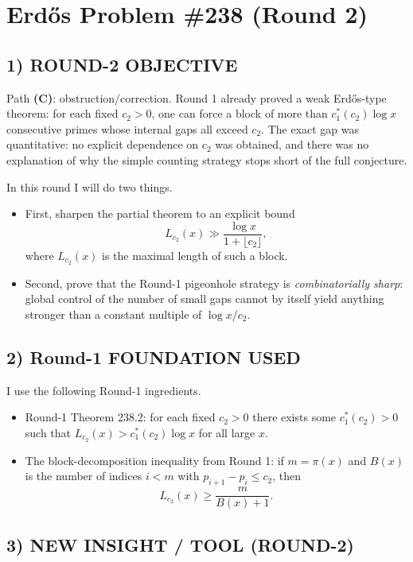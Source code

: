 \section*{Erd\H{o}s Problem \#238 (Round 2)}

\subsection*{1) ROUND-2 OBJECTIVE}

Path \textbf{(C)}: obstruction/correction. Round 1 already proved a weak Erd\H{o}s-type theorem: for each fixed $c_2>0$, one can force a block of more than $c_1^*(c_2)\log x$ consecutive primes whose internal gaps all exceed $c_2$. The exact gap was quantitative: no explicit dependence on $c_2$ was obtained, and there was no explanation of why the simple counting strategy stops short of the full conjecture.

In this round I will do two things.
\begin{itemize}
\item First, sharpen the partial theorem to an explicit bound
\[
L_{c_2}(x)\gg \frac{\log x}{1+\lfloor c_2\rfloor},
\]
where $L_{c_2}(x)$ is the maximal length of such a block.
\item Second, prove that the Round-1 pigeonhole strategy is \emph{combinatorially sharp}: global control of the number of small gaps cannot by itself yield anything stronger than a constant multiple of $\log x/c_2$.
\end{itemize}

\subsection*{2) Round-1 FOUNDATION USED}

I use the following Round-1 ingredients.

\begin{itemize}
\item Round-1 Theorem 238.2: for each fixed $c_2>0$ there exists some $c_1^*(c_2)>0$ such that $L_{c_2}(x)>c_1^*(c_2)\log x$ for all large $x$.
\item The block-decomposition inequality from Round 1: if $m=\pi(x)$ and $B(x)$ is the number of indices $i<m$ with $p_{i+1}-p_i\le c_2$, then
\[
L_{c_2}(x)\ge \frac{m}{B(x)+1}.
\]
\end{itemize}

\subsection*{3) NEW INSIGHT / TOOL (ROUND-2)}

